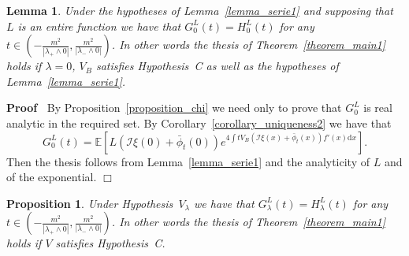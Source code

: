 \documentclass[a4paper,10pt]{article}
\newcommand{\mathd}{\mathrm{d}}
\newenvironment{proof}{\noindent\textbf{Proof\ }}{\hspace*{\fill}$\Box$\medskip}
\newtheorem{lemma}{Lemma}
\newtheorem{proposition}{Proposition}
{\theorembodyfont{\rmfamily}\newtheorem{remark}{Remark}}
\begin{document}
\begin{lemma}
  \label{lemma_serie2}Under the hypotheses of Lemma~\ref{lemma_serie1} and
  supposing that $L$ is an entire function we have that $G^L_0 (t) = H^L_0
  (t)$ for any $t \in \left( - \frac{m^2}{| \lambda_+ \wedge 0 |},
  \frac{m^2}{| \lambda_- \wedge 0 |} \right)$. In other words the thesis of
  Theorem~\ref{theorem_main1} holds if $\lambda = 0$, $V_B$ satisfies
  Hypothesis~C as well as the hypotheses of Lemma~\ref{lemma_serie1}.
\end{lemma}

\begin{proof}
  By Proposition~\ref{proposition_chi} we need only to prove that $G_0^L$ is
  real analytic in the required set. By Corollary~\ref{corollary_uniqueness2}
  we have that
  \[ G^L_0 (t) =\mathbb{E} \left[ L (\mathcal{I} \xi (0) + \bar{\phi}_t (0))
     e^{4 \int t V_B (\mathcal{I} \xi (x) + \bar{\phi}_t (x)) f' (x) \mathd x}
     \right] . \]
  Then the thesis follows from Lemma~\ref{lemma_serie1} and the analyticity of
  $L$ and of the exponential.
\end{proof}

\begin{proposition}
  \label{proposition_serie3}Under Hypothesis~$V_{\lambda}$ we have that
  $G^L_{\lambda} (t) = H^L_{\lambda} (t)$ for any $t \in \left( - \frac{m^2}{|
  \lambda_+ \wedge 0 |}, \frac{m^2}{| \lambda_- \wedge 0 |} \right)$. In other
  words the thesis of Theorem~\ref{theorem_main1} holds if $V$ satisfies
  Hypothesis~C.
\end{proposition}
\end{document}
